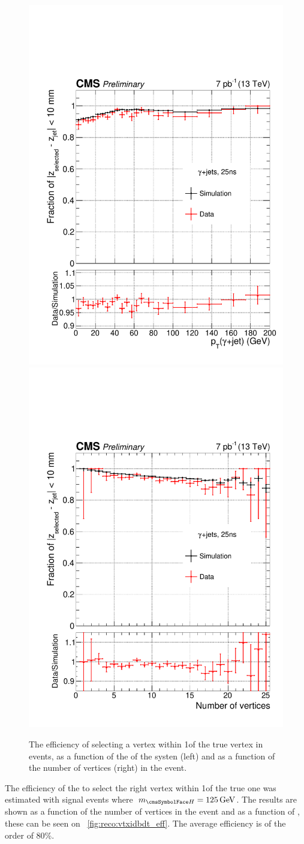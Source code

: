 \begin{figure}
\begin{center}
\includegraphics[width=0.45\linewidth]{recoFigures/last_gamma_jets_eff_vs_pT.pdf}
\includegraphics[width=0.45\linewidth]{recoFigures/last_gamma_jets_nVtx.pdf}
\caption{The efficiency of selecting a vertex within 1\cm of the true vertex in \gammaJet events, as a function of the \pT of the \gammaJet systen (left) and as a function of the number of vertices (right) in the event.}
\label{fig:reco:vtx_if_eff_gjet_validation}
\end{center}
\end{figure}


The efficiency of the \VtxIdBdt to select the right vertex within 1\cm of the true one was estimated with signal events where $\mH=125\GeV$. The results are shown as a function of the number of vertices in the event and as a function of \pT, these can be seen on \Fig~\ref{fig:reco:vtxidbdt_eff}. The average efficiency is of the order of 80\%. 

